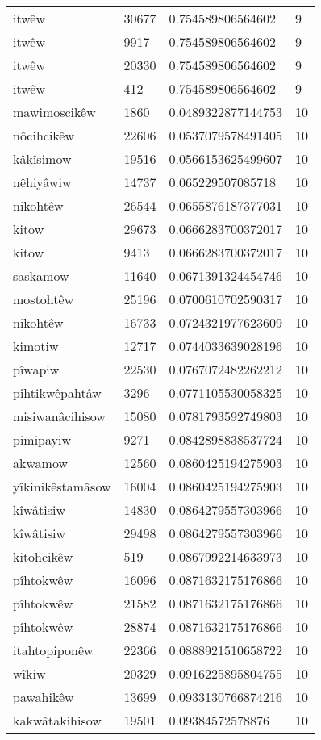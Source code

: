 \begin{longtable}{llll}
itwêw & 30677 & 0.754589806564602 & 9 \\
itwêw & 9917 & 0.754589806564602 & 9 \\
itwêw & 20330 & 0.754589806564602 & 9 \\
itwêw & 412 & 0.754589806564602 & 9 \\
mawimoscikêw & 1860 & 0.0489322877144753 & 10 \\
nôcihcikêw & 22606 & 0.0537079578491405 & 10 \\
kâkîsimow & 19516 & 0.0566153625499607 & 10 \\
nêhiyâwiw & 14737 & 0.065229507085718 & 10 \\
nikohtêw & 26544 & 0.0655876187377031 & 10 \\
kitow & 29673 & 0.0666283700372017 & 10 \\
kitow & 9413 & 0.0666283700372017 & 10 \\
saskamow & 11640 & 0.0671391324454746 & 10 \\
mostohtêw & 25196 & 0.0700610702590317 & 10 \\
nikohtêw & 16733 & 0.0724321977623609 & 10 \\
kimotiw & 12717 & 0.0744033639028196 & 10 \\
pîwapiw & 22530 & 0.0767072482262212 & 10 \\
pîhtikwêpahtâw & 3296 & 0.0771105530058325 & 10 \\
misiwanâcihisow & 15080 & 0.0781793592749803 & 10 \\
pimipayiw & 9271 & 0.0842898838537724 & 10 \\
akwamow & 12560 & 0.0860425194275903 & 10 \\
yîkinikêstamâsow & 16004 & 0.0860425194275903 & 10 \\
kîwâtisiw & 14830 & 0.0864279557303966 & 10 \\
kîwâtisiw & 29498 & 0.0864279557303966 & 10 \\
kitohcikêw & 519 & 0.0867992214633973 & 10 \\
pîhtokwêw & 16096 & 0.0871632175176866 & 10 \\
pîhtokwêw & 21582 & 0.0871632175176866 & 10 \\
pîhtokwêw & 28874 & 0.0871632175176866 & 10 \\
itahtopiponêw & 22366 & 0.0888921510658722 & 10 \\
wîkiw & 20329 & 0.0916225895804755 & 10 \\
pawahikêw & 13699 & 0.0933130766874216 & 10 \\
kakwâtakihisow & 19501 & 0.09384572578876 & 10 \\

\end{longtable}

